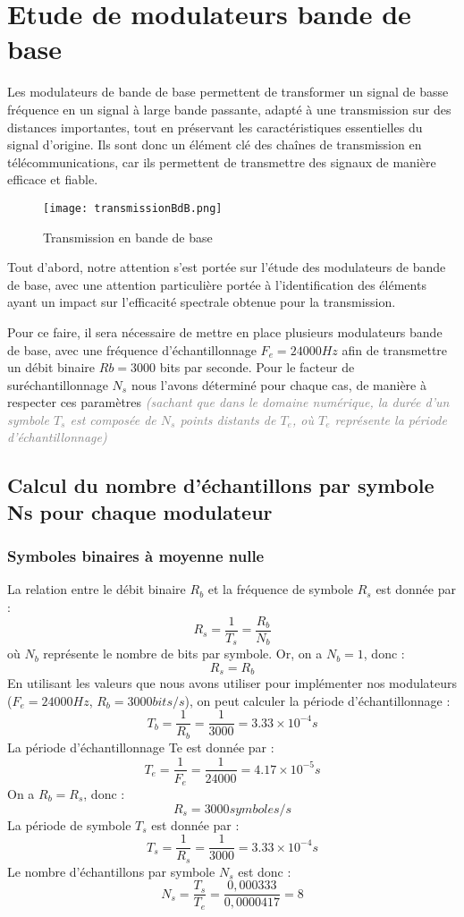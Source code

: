 \documentclass[11pt]{article}
\newcommand{\Gray}[1]{\textcolor{gray}{\textit{#1}}}
\begin{document}
\section{Etude de modulateurs bande de base} 

Les modulateurs de bande de base permettent de transformer un signal de basse fréquence en un signal à large bande passante, adapté à une transmission sur des distances importantes, tout en préservant les caractéristiques essentielles du signal d'origine. Ils sont donc un élément clé des chaînes de transmission en télécommunications, car ils permettent de transmettre des signaux de manière efficace et fiable.\\[8mm]
\begin{figure}[ht!]
            \centering
            \texttt{[image: transmissionBdB.png]}
            \caption{Transmission en bande de base \label{fig : bandebaseimg}}
        \end{figure}
\newpage
Tout d'abord, notre attention s'est portée sur l'étude des modulateurs de bande de base, avec une attention particulière portée à l'identification des éléments ayant un impact sur l'efficacité spectrale obtenue pour la transmission.

Pour ce faire, il sera nécessaire de mettre en place plusieurs modulateurs bande de base, avec une fréquence d'échantillonnage $F_e = 24000 Hz$ afin de transmettre un débit binaire $Rb = 3000$ bits par seconde. Pour le facteur de suréchantillonnage $N_s$ nous l'avons déterminé pour chaque cas, de manière à respecter ces paramètres 
\Gray{(sachant que dans le domaine numérique, la durée d'un symbole $T_s$ est composée de $N_s$ points distants de $T_e$, où $T_e$ représente la période d'échantillonnage)}

    \subsection{Calcul du nombre d'échantillons par symbole Ns pour chaque 
    modulateur}
    \label{NombreEchantillonNs}
    \subsubsection{Symboles binaires à moyenne nulle}
La relation entre le débit binaire $R_b$ et la fréquence de symbole $R_s$ est donnée par :
$$ R_s = \frac{1}{T_s} = \frac{R_b}{N_b} $$ 
où $N_b$ représente le nombre de bits par symbole. Or, on a $N_b = 1$, donc : 
$$R_s = R_b$$
En utilisant les valeurs que nous avons utiliser pour implémenter nos modulateurs ($F_e = 24000 Hz$, $R_b = 3000 bits/s$), on peut calculer la période d'échantillonnage :
$$T_b = \frac{1}{R_b} = \frac{1}{3000} = 3.33 \times 10^{-4} s$$
La période d'échantillonnage Te est donnée par : 
$$T_e = \frac{1}{F_e} = \frac{1}{24000} = 4.17 \times 10^{-5} s$$
On a $R_b = R_s$, donc :
$$R_s = 3000  symboles/s$$
La période de symbole $T_s$ est donnée par :
$$T_s = \frac{1}{R_s} = \frac{1}{3000} = 3.33 \times 10^{-4} s$$
Le nombre d'échantillons par symbole $N_s$ est donc :
$$N_s = \frac{T_s}{T_e} = \frac{0,000333}{0,0000417} = 8$$
\end{document}
